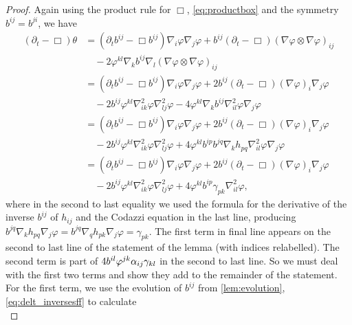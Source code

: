 \documentclass{amsart}
\begin{document}
\begin{proof}
Again using the product rule for \(\Box\), \cref{eq:productbox} and the symmetry \(b^{ij} = b^{ji}\), we have
\begin{equation}
\label{eq:delt_theta}
\begin{split}
(\partial_{t} - \Box)\theta &= (\partial_{t}b^{ij} - \Box b^{ij})\nabla_i \varphi\nabla_j\varphi + b^{ij} (\partial_{t} - \Box) (\nabla\varphi \otimes \nabla\varphi)_{ij} \\
&\quad - 2 \varphi^{kl} \nabla_k b^{ij} \nabla_l (\nabla \varphi \otimes \nabla\varphi)_{ij} \\
&= (\partial_{t}b^{ij} - \Box b^{ij})\nabla_i \varphi\nabla_j\varphi + 2 b^{ij} (\partial_{t} - \Box) (\nabla\varphi)_i \nabla_j\varphi\\ 
&\quad - 2 b^{ij} \varphi^{kl} \nabla^2_{ik} \varphi \nabla^2_{lj} \varphi - 4 \varphi^{kl} \nabla_k b^{ij} \nabla^2_{il} \varphi \nabla_j\varphi \\
&= (\partial_{t}b^{ij} - \Box b^{ij})\nabla_i \varphi\nabla_j\varphi + 2 b^{ij} (\partial_{t} - \Box) (\nabla\varphi)_i \nabla_j\varphi \\
&\quad - 2 b^{ij} \varphi^{kl} \nabla^2_{ik} \varphi \nabla^2_{lj} \varphi + 4 \varphi^{kl} b^{ip}b^{jq} \nabla_k h_{pq} \nabla^2_{il} \varphi \nabla_j\varphi \\
&= (\partial_{t}b^{ij} - \Box b^{ij})\nabla_i \varphi\nabla_j\varphi + 2 b^{ij} (\partial_{t} - \Box) (\nabla\varphi)_i \nabla_j\varphi \\
&\quad - 2 b^{ij} \varphi^{kl} \nabla^2_{ik} \varphi \nabla^2_{lj} \varphi + 4 \varphi^{kl} b^{ip}\gamma_{pk} \nabla^2_{il} \varphi,
\end{split}
\end{equation}
where in the second to last equality we used the formula for the derivative of the inverse \(b^{ij}\) of \(h_{ij}\) and the Codazzi equation in the last line, producing \(b^{jq} \nabla_k h_{pq} \nabla_j \varphi = b^{jq} \nabla_q h_{pk} \nabla_j \varphi = \gamma_{pk}\). The first term in final line appears on the second to last line of the statement of the lemma (with indices relabelled). The second term is part of \(4 b^{il}\varphi^{jk} \alpha_{ij} \gamma_{kl}\) in the second to last line. So we must deal with the first two terms and show they add to the remainder of the statement. For the first term, we use the evolution of \(b^{ij}\) from \cref{lem:evolution}, \cref{eq:delt_inversesff} to calculate
\begin{equation}
\label{eq:delt_theta1}

\end{equation}
\end{proof}
\end{document}
